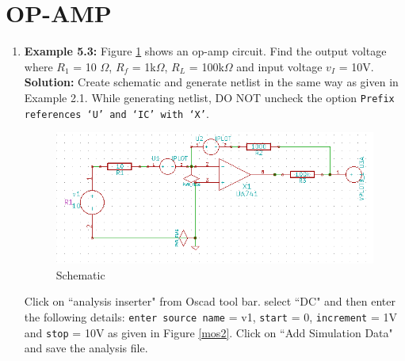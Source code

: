 \section {OP-AMP}
\begin{enumerate}
\item \textbf{Example 5.3:} Figure \ref{apd19} shows an op-amp circuit. Find the output voltage where $R_1$ = 10 $\Omega$, $R_f$ = 1k$\Omega$, $R_L$ = 100k$\Omega$ and input voltage $v_I$ = 10V.\\


\textbf{Solution:} Create schematic and generate netlist in the same way as given in Example 2.1. While generating netlist, DO NOT uncheck the option {\tt Prefix references `U' and `IC' with `X'}.

\begin{figure}%
\begin{center}
\includegraphics[width=0.7\linewidth]{figures/apd19.png}%
\caption{Schematic}
\label{apd19}
\end{center}
\end{figure}
Click on ``analysis inserter" from Oscad tool bar.
select ``DC" and then enter the following details:
{\tt enter source name} = v1, {\tt start} = 0, {\tt increment} = 1V and {\tt stop} = 10V as given in Figure \ref{mos2}. Click on ``Add Simulation Data" and save the analysis file. 



\end{enumerate}
